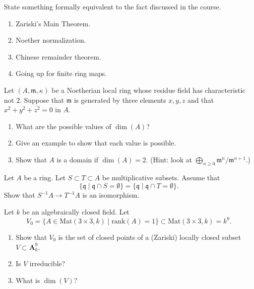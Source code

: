\begin{exercise}[Results]
\label{exercise-results-fall-2011}
State something formally equivalent to the fact discussed
in the course.
\begin{enumerate}
\item Zariski's Main Theorem.
\item Noether normalization.
\item Chinese remainder theorem.
\item Going up for finite ring maps.
\end{enumerate}
\end{exercise}

\begin{exercise}
\label{exercise-dimension-of-ring}
Let $(A, \mathfrak m, \kappa)$ be a Noetherian local ring
whose residue field has characteristic not $2$.
Suppose that $\mathfrak m$ is generated by three elements
$x, y, z$ and that $x^2 + y^2 + z^2 = 0$ in $A$.
\begin{enumerate}
\item What are the possible values of $\dim(A)$?
\item Give an example to show that each value is possible.
\item Show that $A$ is a domain if $\dim(A) = 2$.
(Hint: look at
$\bigoplus_{n \geq 0} \mathfrak m^n/\mathfrak m^{n + 1}$.)
\end{enumerate}
\end{exercise}

\begin{exercise}
\label{exercise-localization}
Let $A$ be a ring.
Let $S \subset T \subset A$ be multiplicative subsets.
Assume that
$$
\{\mathfrak q \mid \mathfrak q \cap S = \emptyset\} =
\{\mathfrak q \mid \mathfrak q \cap T = \emptyset\}.
$$
Show that $S^{-1}A \to T^{-1}A$ is an isomorphism.
\end{exercise}

\begin{exercise}
\label{exercise-locus-of-rank-1}
Let $k$ be an algebraically closed field. Let
$$
V_0 = \{ A \in \text{Mat}(3 \times 3, k) \mid \text{rank}(A) = 1\}
\subset \text{Mat}(3 \times 3, k) = k^9.
$$
\begin{enumerate}
\item Show that $V_0$ is the set of closed points of a
(Zariski) locally closed subset $V \subset \mathbf{A}^9_k$.
\item Is $V$ irreducible?
\item What is $\dim(V)$?
\end{enumerate}
\end{exercise}

